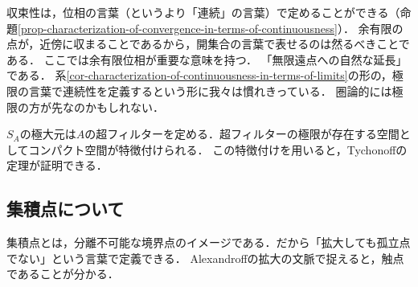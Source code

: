 \documentclass[uplatex,dvipdfmx]{jsreport}
\begin{document}
\begin{tcolorbox}[colframe=ForestGreen, colback=ForestGreen!10!white, breakable ,colbacktitle=ForestGreen!40!white, coltitle=black,fonttitle=\bfseries\sffamily
    ,title=極限とTychonoffの定理]
    収束性は，位相の言葉（というより「連続」の言葉）で定めることができる（命題\ref{prop-characterization-of-convergence-in-terms-of-continuousness}）．
    余有限の点が，近傍に収まることであるから，開集合の言葉で表せるのは然るべきことである．
    ここでは余有限位相が重要な意味を持つ．
    「無限遠点への自然な延長」である．
    系\ref{cor-characterization-of-continuousness-in-terms-of-limits}の形の，極限の言葉で連続性を定義するという形に我々は慣れきっている．
    圏論的には極限の方が先なのかもしれない．

    $S_A$の極大元は$A$の超フィルターを定める．超フィルターの極限が存在する空間としてコンパクト空間が特徴付けられる．
    この特徴付けを用いると，Tychonoffの定理が証明できる．
\end{tcolorbox}

\subsection{集積点について}

\begin{tcolorbox}[colframe=ForestGreen, colback=ForestGreen!10!white, breakable ,colbacktitle=ForestGreen!40!white, coltitle=black,fonttitle=\bfseries\sffamily
    ,title=集積点について]
    集積点とは，分離不可能な境界点のイメージである．だから「拡大しても孤立点でない」という言葉で定義できる．
    Alexandroffの拡大の文脈で捉えると，触点であることが分かる．
\end{tcolorbox}
\end{document}
